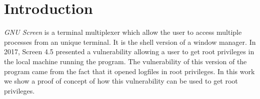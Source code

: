 \section{Introduction}
\emph{GNU Screen} is a terminal multiplexer which allow the user to access multiple processes from an unique terminal. It is the shell version of a window manager. In 2017, Screen 4.5 presented a vulnerability allowing a user to get root privileges in the local machine running the program. The vulnerability of this version of the program came from the fact that it opened logfiles in root privileges. In this work we show a proof of concept of how this vulnerability can be used to get root privileges.

